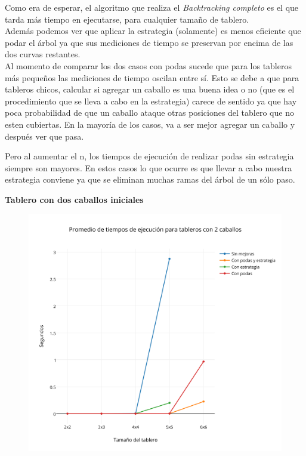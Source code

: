 Como era de esperar, el algoritmo que realiza el \emph{Backtracking completo} es el que tarda más tiempo en ejecutarse, para cualquier tamaño de tablero.\\

Adem\'as podemos ver que aplicar la estrategia (solamente) es menos eficiente que podar el árbol ya que sus mediciones de tiempo se preservan por encima de las dos curvas restantes.\\

Al momento de comparar los dos casos con podas sucede que para los tableros más pequeños las mediciones de tiempo oscilan entre sí. Esto se debe a que para tableros chicos, calcular si agregar un caballo es una buena idea o no (que es el procedimiento que se lleva a cabo en la estrategia) carece de sentido ya que hay poca probabilidad de que un caballo ataque otras posiciones del tablero que no esten cubiertas. En la mayoría de los casos, va a ser mejor agregar un caballo y después ver que pasa.

Pero al aumentar el n, los tiempos de ejecución de realizar podas sin estrategia siempre son mayores. En estos casos lo que ocurre es que llevar a cabo nuestra estrategia conviene ya que se eliminan muchas ramas del árbol de un sólo paso.

\newpage

\textbf{{\Large Tablero con dos caballos iniciales}}
 \begin{figure}[h!]
   \begin{center}
   	\includegraphics[scale=0.3]{../src/ej3/Mediciones/2caballos/promedios1.png} 
   \end{center}
 \end{figure}
   \newpage

